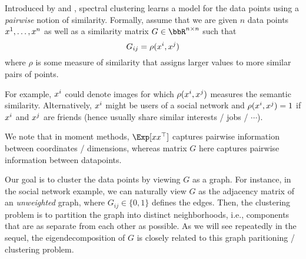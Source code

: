 Introduced by \citet{shi2000normalized} and \citet{ng2001spectral}, spectral clustering learns a model for the data points using a \emph{pairwise} notion of similarity. Formally, assume that we are given $n$ data points $x\sp{1}, \dots, x\sp{n}$ as well as a similarity matrix $G \in \bbR^{n\times n}$ such that 
\begin{equation}
    G_{ij} = \rho (x\sp{i}, x\sp{j})
\end{equation}
where $\rho$ is some measure of similarity that assigns larger values to more similar pairs of points. 

For example, $x\sp{i}$ could denote images for which $\rho (x\sp{i}, x\sp{j})$ measures the semantic similarity. Alternatively, $x\sp{i}$ might be users of a social network and $\rho (x\sp{i}, x\sp{j}) = 1$ if $x\sp{i}$ and $x\sp{j}$ are friends (hence usually share similar interests / jobs / $\cdots$). 

We note that in moment methods, $\Exp[xx^\top]$ captures pairwise information between coordinates / dimensions, whereas matrix $G$ here captures pairwise information between datapoints.

Our goal is to cluster the data points by viewing $G$ as a graph. For instance, in the social network example, we can naturally view $G$ as the adjacency matrix of an \emph{unweighted} graph, where $G_{ij} \in \{0, 1\}$ defines the edges. Then, the clustering problem is to partition the graph into distinct neighborhoods, i.e., components that are as separate from each other as possible. As we will see repeatedly in the sequel, the eigendecomposition of $G$ is closely related to this graph paritioning / clustering problem.



